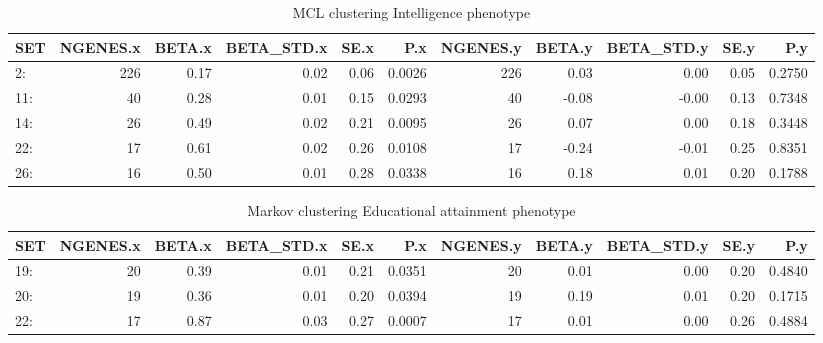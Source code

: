







\begin{table}[ht]
\centering
\begin{adjustbox}{width=\textwidth}

\begin{tabular}{lrrrrrrrrrr}
  \toprule
SET & NGENES.x & BETA.x & BETA\_STD.x & SE.x & P.x & NGENES.y & BETA.y & BETA\_STD.y & SE.y & P.y \\ 
  \midrule
2: & 226 & 0.17 & 0.02 & 0.06 & 0.0026 & 226 & 0.03 & 0.00 & 0.05 & 0.2750 \\ 
  11: & 40 & 0.28 & 0.01 & 0.15 & 0.0293 & 40 & -0.08 & -0.00 & 0.13 & 0.7348 \\ 
  14: & 26 & 0.49 & 0.02 & 0.21 & 0.0095 & 26 & 0.07 & 0.00 & 0.18 & 0.3448 \\ 
  22: & 17 & 0.61 & 0.02 & 0.26 & 0.0108 & 17 & -0.24 & -0.01 & 0.25 & 0.8351 \\ 
  26: & 16 & 0.50 & 0.01 & 0.28 & 0.0338 & 16 & 0.18 & 0.01 & 0.20 & 0.1788 \\ 
   \bottomrule
\end{tabular}
\end{adjustbox}
\caption{MCL clustering Intelligence phenotype} 
\label{tab:MCL clustering Intelligence phenotype}
\end{table}


\begin{table}[ht]
\centering
\begin{adjustbox}{width=\textwidth}
\begin{tabular}{lrrrrrrrrrr}
  \toprule
SET & NGENES.x & BETA.x & BETA\_STD.x & SE.x & P.x & NGENES.y & BETA.y & BETA\_STD.y & SE.y & P.y \\ 
  \midrule
19: & 20 & 0.39 & 0.01 & 0.21 & 0.0351 & 20 & 0.01 & 0.00 & 0.20 & 0.4840 \\ 
  20: & 19 & 0.36 & 0.01 & 0.20 & 0.0394 & 19 & 0.19 & 0.01 & 0.20 & 0.1715 \\ 
  22: & 17 & 0.87 & 0.03 & 0.27 & 0.0007 & 17 & 0.01 & 0.00 & 0.26 & 0.4884 \\ 
   \bottomrule
\end{tabular}
\end{adjustbox}
\caption{Markov clustering Educational attainment phenotype} 
\label{tab:Markov clustering Educational attainment phenotype}
\end{table}



